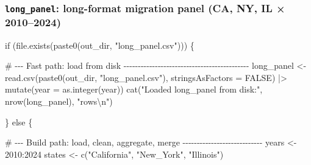 \documentclass[
  11pt,
  letterpaper,
  DIV=11,
  numbers=noendperiod]{scrartcl}
\newenvironment{Shaded}{}{}
\newcommand{\AttributeTok}[1]{\textcolor[rgb]{0.84,0.23,0.29}{#1}}
\newcommand{\CommentTok}[1]{\textcolor[rgb]{0.42,0.45,0.49}{#1}}
\newcommand{\ConstantTok}[1]{\textcolor[rgb]{0.00,0.36,0.77}{#1}}
\newcommand{\ControlFlowTok}[1]{\textcolor[rgb]{0.84,0.23,0.29}{#1}}
\newcommand{\DecValTok}[1]{\textcolor[rgb]{0.00,0.36,0.77}{#1}}
\newcommand{\FunctionTok}[1]{\textcolor[rgb]{0.44,0.26,0.76}{#1}}
\newcommand{\NormalTok}[1]{\textcolor[rgb]{0.14,0.16,0.18}{#1}}
\newcommand{\OtherTok}[1]{\textcolor[rgb]{0.44,0.26,0.76}{#1}}
\newcommand{\SpecialCharTok}[1]{\textcolor[rgb]{0.00,0.36,0.77}{#1}}
\newcommand{\StringTok}[1]{\textcolor[rgb]{0.01,0.18,0.38}{#1}}
\begin{document}
\subsubsection{\texorpdfstring{\texttt{long\_panel}: long-format
migration panel (CA, NY, IL ×
2010--2024)}{long\_panel: long-format migration panel (CA, NY, IL × 2010--2024)}}\label{long_panel-long-format-migration-panel-ca-ny-il-20102024}

\begin{Shaded}
\begin{Highlighting}[]
\ControlFlowTok{if}\NormalTok{ (}\FunctionTok{file.exists}\NormalTok{(}\FunctionTok{paste0}\NormalTok{(out\_dir, }\StringTok{"long\_panel.csv"}\NormalTok{))) \{}

  \CommentTok{\# {-}{-}{-} Fast path: load from disk {-}{-}{-}{-}{-}{-}{-}{-}{-}{-}{-}{-}{-}{-}{-}{-}{-}{-}{-}{-}{-}{-}{-}{-}{-}{-}{-}{-}{-}{-}{-}{-}{-}{-}{-}{-}{-}{-}{-}{-}{-}{-}{-}{-}}
\NormalTok{  long\_panel }\OtherTok{\textless{}{-}} \FunctionTok{read.csv}\NormalTok{(}\FunctionTok{paste0}\NormalTok{(out\_dir, }\StringTok{"long\_panel.csv"}\NormalTok{),}
                         \AttributeTok{stringsAsFactors =} \ConstantTok{FALSE}\NormalTok{) }\SpecialCharTok{|\textgreater{}}
    \FunctionTok{mutate}\NormalTok{(}\AttributeTok{year =} \FunctionTok{as.integer}\NormalTok{(year))}
  \FunctionTok{cat}\NormalTok{(}\StringTok{"Loaded long\_panel from disk:"}\NormalTok{, }\FunctionTok{nrow}\NormalTok{(long\_panel), }\StringTok{"rows}\SpecialCharTok{\textbackslash{}n}\StringTok{"}\NormalTok{)}

\NormalTok{\} }\ControlFlowTok{else}\NormalTok{ \{}

  \CommentTok{\# {-}{-}{-} Build path: load, clean, aggregate, merge {-}{-}{-}{-}{-}{-}{-}{-}{-}{-}{-}{-}{-}{-}{-}{-}{-}{-}{-}{-}{-}{-}{-}{-}{-}{-}{-}{-}}
\NormalTok{  years  }\OtherTok{\textless{}{-}} \DecValTok{2010}\SpecialCharTok{:}\DecValTok{2024}
\NormalTok{  states }\OtherTok{\textless{}{-}} \FunctionTok{c}\NormalTok{(}\StringTok{"California"}\NormalTok{, }\StringTok{"New\_York"}\NormalTok{, }\StringTok{"Illinois"}\NormalTok{)}


\end{Highlighting}
\end{Shaded}
\end{document}
